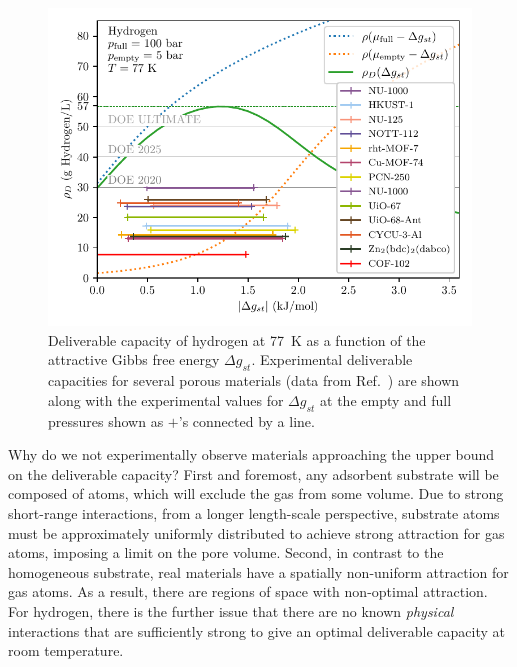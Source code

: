 \documentclass[twoside,twocolumn,9pt]{article}
\newcommand\gst{\ensuremath{\Delta g_{st}}}
\begin{document}
\begin{figure}
    \centering
    \includegraphics[width=0.95\columnwidth]{hydrogen-77-n-vs-G}
    \caption{Deliverable capacity of hydrogen at 77\ K as a function of the attractive Gibbs free energy $\gst$. Experimental deliverable capacities for several porous materials (data from Ref.~\cite{garcia2018benchmark, furukawa2009storage}) are shown along with the experimental values for $\gst$ at the empty and full pressures shown as $+$'s connected by a line.}
    \label{fig:hydrogen-77-D}
\end{figure}

Why do we not experimentally observe materials approaching the upper bound on
the deliverable capacity? First and foremost, any adsorbent substrate will be composed of
atoms, which will exclude the gas from some volume. Due to strong short-range
interactions, from a longer length-scale perspective, substrate atoms must be approximately uniformly distributed to achieve strong
attraction for gas atoms, imposing a limit on the pore
volume. Second, in contrast to the homogeneous substrate, real materials have a spatially non-uniform attraction for
gas atoms. As a result, there are regions of space with
non-optimal attraction. For hydrogen, there is the further issue that there are
no known \emph{physical} interactions that are sufficiently strong to give an
optimal deliverable capacity at room temperature.
\end{document}
